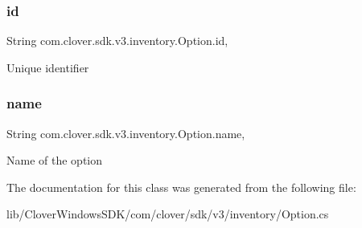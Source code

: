 \subsubsection{\texorpdfstring{id}{id}}
{\footnotesize\ttfamily String com.\+clover.\+sdk.\+v3.\+inventory.\+Option.\+id\hspace{0.3cm}{\ttfamily [get]}, {\ttfamily [set]}}



Unique identifier 

\mbox{\label{classcom_1_1clover_1_1sdk_1_1v3_1_1inventory_1_1_option_a1e65b5dc17e96ddce0588e7908eb6e45}} 
\subsubsection{\texorpdfstring{name}{name}}
{\footnotesize\ttfamily String com.\+clover.\+sdk.\+v3.\+inventory.\+Option.\+name\hspace{0.3cm}{\ttfamily [get]}, {\ttfamily [set]}}



Name of the option 



The documentation for this class was generated from the following file\+:\begin{DoxyCompactItemize}
\item 
lib/\+Clover\+Windows\+S\+D\+K/com/clover/sdk/v3/inventory/Option.\+cs\end{DoxyCompactItemize}
